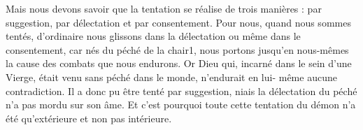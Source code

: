 Mais nous devons savoir que la tentation se réalise de trois manières : par suggestion, par délectation et par consentement. Pour nous, quand nous sommes tentés, d’ordinaire nous glissons dans la délectation ou même dans le consentement, car nés du péché de la chair1, nous portons jusqu’en nous-mêmes la cause des combats que nous endurons. Or Dieu qui, incarné dans le sein d’une Vierge, était venu sans péché dans le monde, n’endurait en lui- même aucune contradiction. Il a donc pu être tenté par suggestion, niais la délectation du péché n’a pas mordu sur son âme. Et c’est pourquoi toute cette tentation du démon n’a été qu’extérieure et non pas intérieure.

